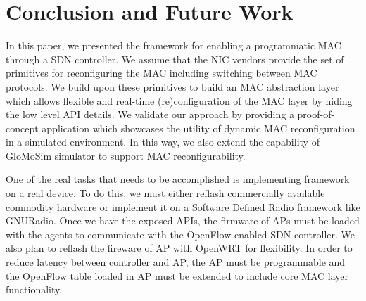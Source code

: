 \section{Conclusion and Future Work}
\label{sec:conclusion}
In this paper, we presented the \pmac framework for enabling a programmatic MAC through a SDN controller. We assume that the NIC vendors provide the set of primitives for reconfiguring the MAC including switching between MAC protocols. We build upon these primitives to build an MAC abstraction layer which allows flexible and real-time (re)configuration of the MAC layer by hiding the low level API details. We validate our approach by providing a proof-of-concept application which showcases the utility of dynamic MAC reconfiguration in a simulated environment. In this way, we also extend the capability of GloMoSim simulator to support MAC reconfigurability.

One of the real tasks that needs to be accomplished is implementing \pmac framework on a real device. To do this, we must either reflash commercially available commodity hardware or implement it on a Software Defined Radio framework like GNURadio. Once we have the exposed APIs, the firmware of APs must be loaded with the agents to communicate with the OpenFlow enabled SDN controller. We also plan to reflash the fireware of AP with OpenWRT \cite{openwrt} for flexibility. In order to reduce latency between controller and AP, the AP must be programmable and the OpenFlow table loaded in AP must be extended to include core MAC layer functionality.
